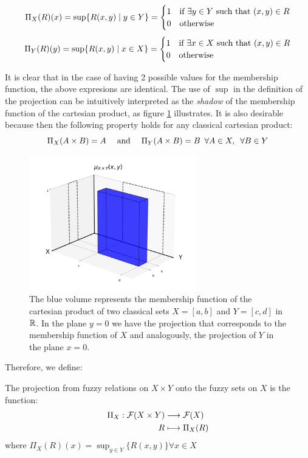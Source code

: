 \[\Pi_X(R)(x)=\sup\{R(x,y) \mid y\in Y\}=
\begin{cases}
  1 & \textnormal{if } \exists y \in Y \textnormal{ such that } (x,y) \in R \\
  0 & \textnormal{otherwise}
\end{cases}
\]
\[
  \Pi_Y(R)(y)=\sup\{R(x,y) \mid x\in X\}=
  \begin{cases}
    1 & \textnormal{if } \exists x \in X \textnormal{ such that } (x,y) \in R \\
    0 & \textnormal{otherwise}
  \end{cases}
\]

It is clear that in the case of having 2 possible values for the membership function, the above expresions are identical. The use of $\sup$ in the definition of the projection can be intuitively interpreted as the \textit{shadow} of the membership function of the cartesian product, as figure \ref{fig:class_cart_prod} illustrates. It is also desirable because then the following property holds for any classical  cartesian product:\\
$$ 
\Pi_X(A\times B)=A \quad \textnormal{ and } \quad \Pi_Y(A\times B)=B \forall A\in X, \forall B \in Y
$$

\begin{figure}[ht]
  \centering
  \includegraphics[width=0.65\textwidth]{ch1/figures/class_cart_prod.png}
  \caption{The blue volume represents the membership function of the cartesian product of two classical sets $X=[a,b]$ and $Y=[c,d]$ in $\mathbb{R}$. In the plane $y=0$ we have the projection that corresponds to the membership function of $X$ and analogously, the projection of $Y$ in the plane $x=0$.}
  \label{fig:class_cart_prod}
\end{figure}

Therefore, we define:

\begin{definition}
  The projection from fuzzy relations on $X\times Y$ onto the fuzzy sets on $X$ is the function:
  \[
    \begin{aligned}
      \Pi_X: \mathcal{F}(X\times Y) &\longrightarrow \mathcal{F}(X) \\
      R &\longmapsto \Pi_X(R)
    \end{aligned}
  \]
  where $\Pi_X(R)(x) = \sup_{y\in Y}\{R(x,y)\}\forall x \in X$
\end{definition}


